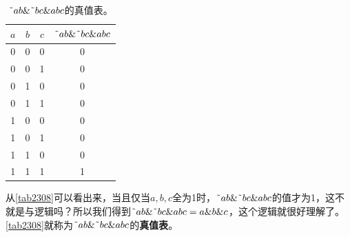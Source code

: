 \begin{table}[!h]
\centering
\begin{tabular}{|c|c|c||c|}
\hline
$a$&$b$&$c$&$\textrm{\~{}}ab\&\textrm{\~{}}bc\&abc$\\\hline
0&0&0&0\\\hline
0&0&1&0\\\hline
0&1&0&0\\\hline
0&1&1&0\\\hline
1&0&0&0\\\hline
1&0&1&0\\\hline
1&1&0&0\\\hline
1&1&1&1\\\hline
\end{tabular}
\caption{$\textrm{\~{}}ab\&\textrm{\~{}}bc\&abc$的真值表。}\label{tab2308}
\end{table}

从\autoref{tab2308}可以看出来，当且仅当$a,b,c$全为1时，$\textrm{\~{}}ab\&\textrm{\~{}}bc\&abc$的值才为1，这不就是与逻辑吗？所以我们得到$\textrm{\~{}}ab\&\textrm{\~{}}bc\&abc=a\&b\&c$，这个逻辑就很好理解了。\autoref{tab2308}就称为$\textrm{\~{}}ab\&\textrm{\~{}}bc\&abc$的\textbf{真值表}。

